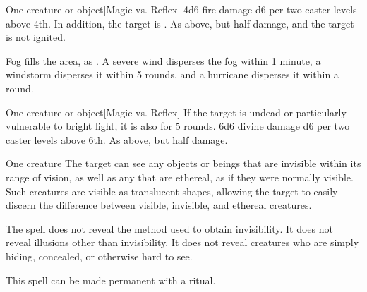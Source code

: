\spellrng{\rngclose}
\spelldur{\durshort}
\begin{spelltarget}{One creature or object}[Magic vs. Reflex]
    \spellsuccess 4d6 fire damage \add d6 per two caster levels above 4th. In addition, the target is \ignited.
    \spellfailure As above, but half damage, and the target is not ignited.
\end{spelltarget}

\spellline
\spelleffect Fog fills the area, as .
\spellnotes \fogspellnotes A severe wind disperses the fog within 1 minute, a windstorm disperses it within 5 rounds, and a hurricane disperses it within a round.

\spellrng{\rngclose}
\begin{spelltarget}{One creature or object}[Magic vs. Reflex]
    \spelleffect If the target is undead or particularly vulnerable to bright light, it is also \dazzled for 5 rounds.
    \spellsuccess 6d6 divine damage \add d6 per two caster levels above 6th.
    \spellfailure As above, but half damage.
\end{spelltarget}

\spelldur{\durlong \dismissable}
\begin{spelltarget}{One creature}
    \spelleffect The target can see any objects or beings that are invisible within its range of vision, as well as any that are ethereal, as if they were normally visible. Such creatures are visible as translucent shapes, allowing the target to easily discern the difference between visible, invisible, and ethereal creatures.
\end{spelltarget}
\spellnotes The spell does not reveal the method used to obtain invisibility. It does not reveal illusions other than invisibility. It does not reveal creatures who are simply hiding, concealed, or otherwise hard to see.

This spell can be made permanent with a  ritual.

